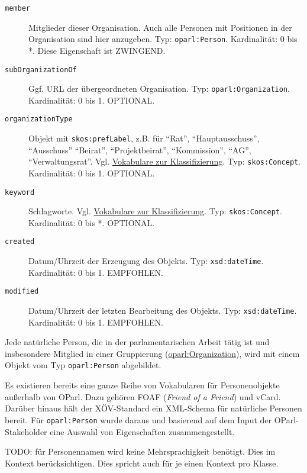\documentclass[,a4paper]{article}
\begin{document}
\begin{description}
\item[\texttt{member}]
Mitglieder dieser Organisation. Auch alle Personen mit Positionen in der
Organisation sind hier anzugeben. Typ: \texttt{oparl:Person}.
Kardinalität: 0 bis *. Diese Eigenschaft ist ZWINGEND.
\item[\texttt{subOrganizationOf}]
Ggf. URL der übergeordneten Organisation. Typ:
\texttt{oparl:Organization}. Kardinalität: 0 bis 1. OPTIONAL.
\item[\texttt{organizationType}]
Objekt mit \texttt{skos:prefLabel}, z.B. für ``Rat'',
``Hauptausschuss'', ``Ausschuss'' ``Beirat'', ``Projektbeirat'',
``Kommission'', ``AG'', ``Verwaltungsrat''. Vgl.
\hyperref[vokabulareux5fklassifizierung]{Vokabulare zur
Klassifizierung}. Typ: \texttt{skos:Concept}. Kardinalität: 0 bis 1.
OPTIONAL.
\item[\texttt{keyword}]
Schlagworte. Vgl. \hyperref[vokabulareux5fklassifizierung]{Vokabulare
zur Klassifizierung}. Typ: \texttt{skos:Concept}. Kardinalität: 0 bis *.
OPTIONAL.
\item[\texttt{created}]
Datum/Uhrzeit der Erzeugung des Objekts. Typ: \texttt{xsd:dateTime}.
Kardinalität: 0 bis 1. EMPFOHLEN.
\item[\texttt{modified}]
Datum/Uhrzeit der letzten Bearbeitung des Objekts. Typ:
\texttt{xsd:dateTime}. Kardinalität: 0 bis 1. EMPFOHLEN.
\end{description}


Jede natürliche Person, die in der parlamentarischen Arbeit tätig ist
und insbesondere Mitglied in einer Gruppierung
(\hyperref[oparlux5forganization]{oparl:Organization}), wird mit einem
Objekt vom Typ \texttt{oparl:Person} abgebildet.

Es existieren bereits eine ganze Reihe von Vokabularen für
Personenobjekte außerhalb von OParl. Dazu gehören FOAF (\emph{Friend of
a Friend}) und vCard. Darüber hinaus hält der XÖV-Standard ein
XML-Schema für natürliche Personen bereit. Für \texttt{oparl:Person}
wurde daraus und basierend auf dem Input der OParl-Stakeholder eine
Auswahl von Eigenschaften zusammengestellt.

TODO: für Personennamen wird keine Mehrsprachigkeit benötigt. Dies im
Kontext berücksichtigen. Dies spricht auch für je einen Kontext pro
Klasse.
\end{document}
